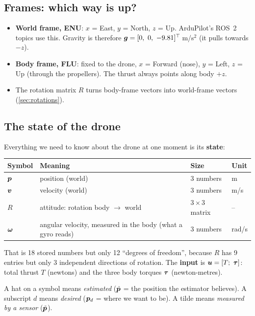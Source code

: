 \subsection{Frames: which way is up?}

\begin{itemize}
  \item \textbf{World frame, ENU}: $x$ = East, $y$ = North, $z$ = Up. ArduPilot's ROS~2 topics use this. Gravity
        is therefore $\vg=[0,\ 0,\ -9.81]^\top$\,m/s$^2$ (it pulls towards $-z$).
  \item \textbf{Body frame, FLU}: fixed to the drone, $x$ = Forward (nose), $y$ = Left, $z$ = Up (through the
        propellers). The thrust always points along body $+z$.
  \item The rotation matrix $R$ turns body-frame vectors into world-frame vectors (\cref{sec:rotations}).
\end{itemize}

\subsection{The state of the drone}

Everything we need to know about the drone at one moment is its \textbf{state}:
\begin{center}\small
\begin{tabular}{@{}l l l l@{}}
\toprule
\textbf{Symbol} & \textbf{Meaning} & \textbf{Size} & \textbf{Unit}\\
\midrule
$\bm{p}$ & position (world) & 3 numbers & m\\
$\bm{v}$ & velocity (world) & 3 numbers & m/s\\
$R$ & attitude: rotation body $\rightarrow$ world & $3\times3$ matrix & --\\
$\bm{\omega}$ & angular velocity, measured in the body (what a gyro reads) & 3 numbers & rad/s\\
\bottomrule
\end{tabular}
\end{center}
That is 18 stored numbers but only 12 ``degrees of freedom'', because $R$ has 9 entries but only 3 independent
directions of rotation. The \textbf{input} is $\vu=[T;\ \vtau]$: total thrust $T$ (newtons) and the three body
torques $\bm{\tau}$ (newton-metres).

A hat on a symbol means \emph{estimated} ($\hat{\bm p}$ = the position the estimator believes). A subscript $d$ means
\emph{desired} ($\bm{p}_d$ = where we want to be). A tilde means \emph{measured by a sensor} ($\tilde{\bm{p}}$).

